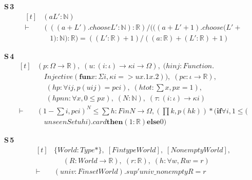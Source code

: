 \noindent\textbf{S\,3}\quad{}
{\footnotesize\[ \begin{aligned}[t]
&(\mathit{a} \mathit{L'} : \mathbb{N} )\\
\vdash\;&(((\mathit{a} + \mathit{L'}).\mathit{choose} \mathit{L'} : \mathbb{N} ) : \mathbb{R} ) / (((\mathit{a} + \mathit{L'} + 1).\mathit{choose} (\mathit{L'} +\\
&\quad 1) : \mathbb{N} ) : \mathbb{R} ) = ((\mathit{L'} : \mathbb{R} ) + 1) / ((\mathit{a} : \mathbb{R} ) + (\mathit{L'} : \mathbb{R} ) + 1)
\end{aligned} \]}

\noindent\textbf{S\,4}\quad{}
{\footnotesize\[ \begin{aligned}[t]
&(\mathit{p} : \Omega \to \mathbb{R} ),\; (\mathit{u} : (\mathit{i} : \iota ) \to \kappa \mathit{i} \to \Omega ),\; (\mathit{hinj} : \mathit{Function}.\\
&\quad \mathit{Injective} (\mathbf{fun} \mathit{x} : \Sigma \mathit{i}, \kappa \mathit{i} => \mathit{u} \mathit{x}.1 \mathit{x}.2)),\; (\mathit{pc} : \iota \to \mathbb{R} ),\\
&\quad \; (\mathit{hp} : \forall \mathit{i} \mathit{j}, \mathit{p} (\mathit{u} \mathit{i} \mathit{j}) = \mathit{pc} \mathit{i}),\; (\mathit{htot} : \textstyle\sum \mathit{x}, \mathit{p} \mathit{x} = 1),\\
&\quad \; (\mathit{hpnn} : \forall \mathit{x}, 0 \leq \mathit{p} \mathit{x}),\; (\mathit{N} : \mathbb{N} ),\; (\tau : (\mathit{i} : \iota ) \to \kappa \mathit{i})\\
\vdash\;&(1 - \textstyle\sum \mathit{i}, \mathit{pc} \mathit{i}) ^{\mathit{N}} \leq \textstyle\sum \mathit{h} : \mathit{Fin} \mathit{N} \to \Omega , (\textstyle\prod \mathit{k}, \mathit{p} (\mathit{h} \mathit{k})) * (\mathbf{if} \forall \mathit{i}, 1 \leq (\\
&\quad \mathit{unseenSet} \mathit{u} \mathit{h} \mathit{i}).\mathit{card} \mathbf{then} (1:\mathbb{R} ) \mathbf{else} 0)
\end{aligned} \]}

\noindent\textbf{S\,5}\quad{}
{\footnotesize\[ \begin{aligned}[t]
&\{ \mathit{World} : \mathit{Type}*\},\; [\mathit{Fintype} \mathit{World}],\; [\mathit{Nonempty} \mathit{World}],\\
&\quad \; (\mathit{R} : \mathit{World} \to \mathbb{R} ),\; (\mathit{r} : \mathbb{R} ),\; (\mathit{h} : \forall \mathit{w}, \mathit{R} \mathit{w} = \mathit{r})\\
\vdash\;&(\mathit{univ} : \mathit{Finset} \mathit{World}).\mathit{sup'} \mathit{univ\_nonempty} \mathit{R} = \mathit{r}
\end{aligned} \]}


